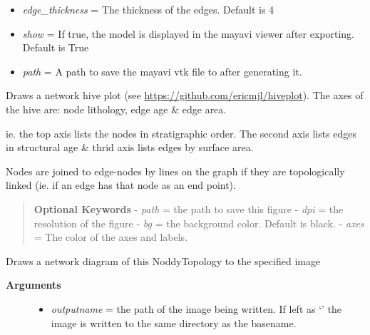 \documentclass[a4paper,10pt,english]{sphinxmanual}
\begin{document}
\begin{fulllineitems}
\begin{fulllineitems}
\begin{description}
\begin{itemize}
\item {} 
\emph{edge\_thickness} = The thickness of the edges. Default is 4

\item {} 
\emph{show} = If true, the model is displayed in the mayavi viewer after exporting. Default is True

\item {} 
\emph{path} = A path to save the mayavi vtk file to after generating it.

\end{itemize}

\end{description}

\end{fulllineitems}


\begin{fulllineitems}
\label{pynoddy:pynoddy.output.NoddyTopology.draw_network_hive}
Draws a network hive plot (see \href{https://github.com/ericmjl/hiveplot}{https://github.com/ericmjl/hiveplot}).
The axes of the hive are: node lithology, edge age \& edge area.

ie. the top axis lists the nodes in stratigraphic order. The second axis
lists edges in structural age \& thrid axis lists edges by surface area.

Nodes are joined to edge-nodes by lines on the graph if they are topologically linked
(ie. if an edge has that node as an end point).
\begin{quote}

\textbf{Optional Keywords}
- \emph{path} = the path to save this figure
- \emph{dpi} = the resolution of the figure
- \emph{bg} = the background color. Default is black.
- \emph{axes} = The color of the axes and labels.
\end{quote}

\end{fulllineitems}


\begin{fulllineitems}
\label{pynoddy:pynoddy.output.NoddyTopology.draw_network_image}
Draws a network diagram of this NoddyTopology to the specified image
\begin{description}
\item[{\textbf{Arguments}}] \leavevmode\begin{itemize}
\item {} 
\emph{outputname} = the path of the image being written. If left as `' the image is written to the same directory as the basename.


\end{itemize}
\end{description}
\end{fulllineitems}
\end{fulllineitems}
\end{document}
